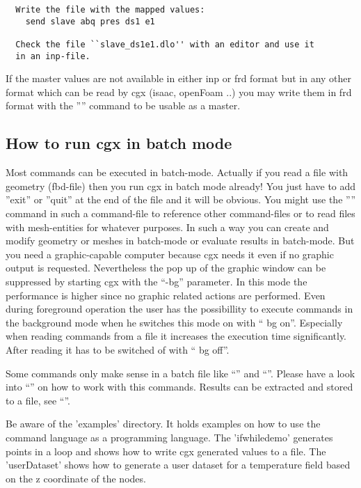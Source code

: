 \documentclass{article}
\begin{document}
\begin{appendix}
\begin{verbatim}
  Write the file with the mapped values:
    send slave abq pres ds1 e1

  Check the file ``slave_ds1e1.dlo'' with an editor and use it
  in an inp-file.
\end{verbatim}
If the master values are not available in either inp or frd format but in any other format which can be read by cgx (isaac, openFoam ..) you may write them in frd format with the '''' command to be usable as a master.


\subsection{\label{How to run cgx in batch mode}How to run cgx in batch mode}
Most commands can be executed in batch-mode. Actually if you read a file with geometry (fbd-file) then you run cgx in batch mode already! You just have to add ''exit'' or ''quit'' at the end of the file and it will be obvious. You might use the '''' command in such a command-file to reference other command-files or to read files with mesh-entities for whatever purposes. In such a way you can create and modify geometry or meshes in batch-mode or evaluate results in batch-mode. But you need a graphic-capable computer because cgx needs it even if no graphic output is requested. Nevertheless the pop up of the graphic window can be suppressed by starting cgx with the ``-bg'' parameter. In this mode the performance is higher since no graphic related actions are performed. Even during foreground operation the user has the possibillity to execute commands in the background mode when he switches this mode on with `` bg on''. Especially when reading commands from a file it increases the execution time significantly. After reading it has to be switched of with `` bg off''.

Some commands only make sense in a batch file like ``'' and ``''. Please have a look into ``'' on how to work with this commands. Results can be extracted and stored to a file, see ``''.

Be aware of the 'examples' directory. It holds examples on how to use the command language as a programming language. The 'ifwhiledemo' generates points in a loop and shows how to write cgx generated values to a file. The 'userDataset' shows how to generate a user dataset for a temperature field based on the z coordinate of the nodes.


\end{appendix}
\end{document}
